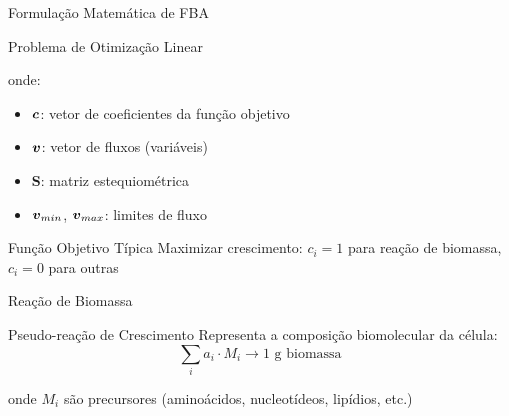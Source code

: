 \begin{frame}{Formulação Matemática de FBA}
\begin{block}{Problema de Otimização Linear}

onde:
\begin{itemize}
    \item $\boldsymbol{c}$: vetor de coeficientes da função objetivo
    \item $\boldsymbol{v}$: vetor de fluxos (variáveis)
    \item $\mathbf{S}$: matriz estequiométrica
    \item $\boldsymbol{v}_{min}$, $\boldsymbol{v}_{max}$: limites de fluxo
\end{itemize}
\end{block}

\begin{exampleblock}{Função Objetivo Típica}
Maximizar crescimento: $c_i = 1$ para reação de biomassa, $c_i = 0$ para outras
\end{exampleblock}
\end{frame}

\begin{frame}{Reação de Biomassa}
\begin{block}{Pseudo-reação de Crescimento}
Representa a composição biomolecular da célula:
\begin{equation*}
\sum_i a_i \cdot M_i \rightarrow 1 \text{ g biomassa}
\end{equation*}

onde $M_i$ são precursores (aminoácidos, nucleotídeos, lipídios, etc.)
\end{block}


\end{frame}

